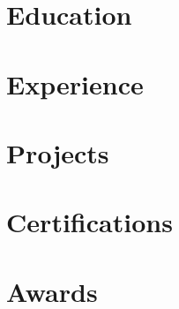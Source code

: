 \documentclass[10pt, letterpaper]{article}
\begin{document}
	\section{\faUniversity\ Education}
	
	
	\section{\faBriefcase\ Experience}
	
	
	\section{\faCode\ Projects}
	
	
	\section{\faCertificate\ Certifications}
	
	
	\section{\faTrophy\ Awards}
	
	
\end{document}
